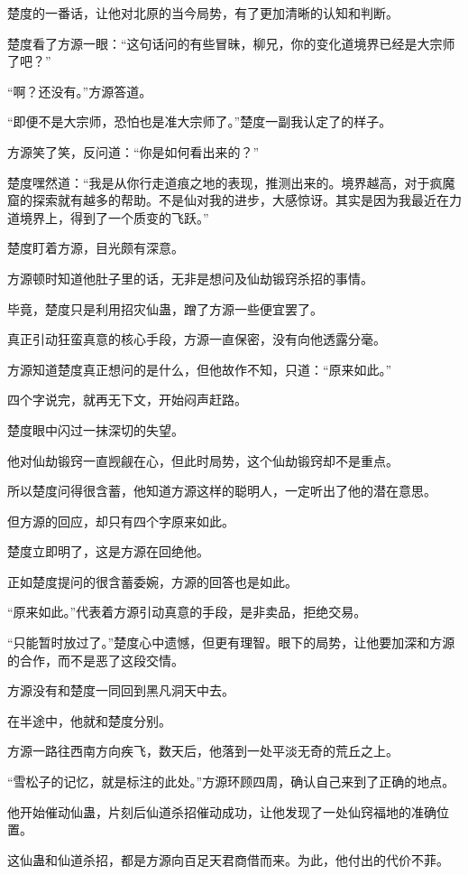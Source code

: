 \begin{this_body}
楚度的一番话，让他对北原的当今局势，有了更加清晰的认知和判断。

楚度看了方源一眼：“这句话问的有些冒昧，柳兄，你的变化道境界已经是大宗师了吧？”

“啊？还没有。”方源答道。

“即便不是大宗师，恐怕也是准大宗师了。”楚度一副我认定了的样子。

方源笑了笑，反问道：“你是如何看出来的？”

楚度嘿然道：“我是从你行走道痕之地的表现，推测出来的。境界越高，对于疯魔窟的探索就有越多的帮助。不是仙对我的进步，大感惊讶。其实是因为我最近在力道境界上，得到了一个质变的飞跃。”

楚度盯着方源，目光颇有深意。

方源顿时知道他肚子里的话，无非是想问及仙劫锻窍杀招的事情。

毕竟，楚度只是利用招灾仙蛊，蹭了方源一些便宜罢了。

真正引动狂蛮真意的核心手段，方源一直保密，没有向他透露分毫。

方源知道楚度真正想问的是什么，但他故作不知，只道：“原来如此。”

四个字说完，就再无下文，开始闷声赶路。

楚度眼中闪过一抹深切的失望。

他对仙劫锻窍一直觊觎在心，但此时局势，这个仙劫锻窍却不是重点。

所以楚度问得很含蓄，他知道方源这样的聪明人，一定听出了他的潜在意思。

但方源的回应，却只有四个字原来如此。

楚度立即明了，这是方源在回绝他。

正如楚度提问的很含蓄委婉，方源的回答也是如此。

“原来如此。”代表着方源引动真意的手段，是非卖品，拒绝交易。

“只能暂时放过了。”楚度心中遗憾，但更有理智。眼下的局势，让他要加深和方源的合作，而不是恶了这段交情。

方源没有和楚度一同回到黑凡洞天中去。

在半途中，他就和楚度分别。

方源一路往西南方向疾飞，数天后，他落到一处平淡无奇的荒丘之上。

“雪松子的记忆，就是标注的此处。”方源环顾四周，确认自己来到了正确的地点。

他开始催动仙蛊，片刻后仙道杀招催动成功，让他发现了一处仙窍福地的准确位置。

这仙蛊和仙道杀招，都是方源向百足天君商借而来。为此，他付出的代价不菲。


\end{this_body}
